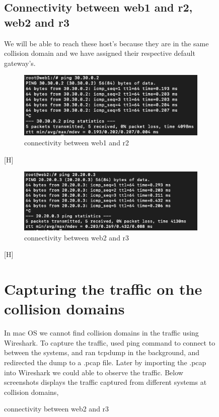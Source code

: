 \begin{figure}[H]
\subsection{Connectivity between web1 and r2, web2 and r3}
We will be able to reach these host's because they are in the same collision domain and we have assigned their respective default gateway's.
\begin{figure}[H]
\centering
  \includegraphics[width=400pt]{Images/Connectivity between web1 and r2.png}
  \caption{connectivity between web1 and r2}
  \label{fig:3.1}
\end{figure} [H]
\begin{figure}[H]
\centering
  \includegraphics[width=400pt]{Images/Connectivity between web2 and r3.png}
  \caption{connectivity between web2 and r3}
  \label{fig:3.1}
\end{figure} [H]

\section{Capturing the traffic on the collision domains}
In mac OS we cannot find collision domains in the traffic using Wireshark. To capture the traffic, used ping command to connect to between the systems, and ran tcpdump in the background, and redirected the dump to a .pcap file. Later by importing the .pcap into Wireshark we could able to observe the traffic.
\newline Below screenshots displays the traffic captured from different systems at collision domains,

\end{figure}
